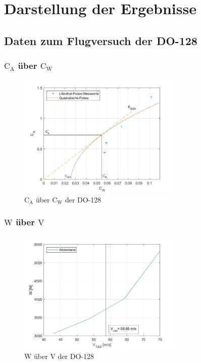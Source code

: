\chapter{Darstellung der Ergebnisse}
\label{c:Ergebnisse}

\section{Daten zum Flugversuch der DO-128}

\subsection{$\mathrm{C}_{\mathrm{A}}$ über $\mathrm{C}_{\mathrm{W}}$}

\begin{figure}[H]
	\centering	\includegraphics[width=0.7\textwidth]{./Bilder/CA_CW_fertig.jpg}
	\caption{$\mathrm{C}_{\mathrm{A}}$ über $\mathrm{C}_{\mathrm{W}}$ der DO-128}
	\label{fig:CA_CW_DO128}
\end{figure}

\subsection{$\mathrm{W}$ über $\mathrm{V}$}

\begin{figure}[H]
	\centering	\includegraphics[width=0.7\textwidth]{./Bilder/W_uber_V.jpg}
	\caption{$\mathrm{W}$ über $\mathrm{V}$ der DO-128}
	\label{fig:W_V_DO128}
\end{figure}

